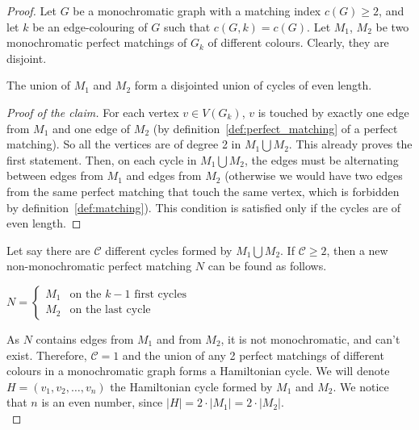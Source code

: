 \begin{proof}
    Let $G$ be a monochromatic graph with a matching index $c(G) \geq 2$, and let $k$ be an edge-colouring of $G$ such that $c(G, k) = c(G)$.
    Let $M_1$, $M_2$ be two monochromatic perfect matchings of $G_k$ of different colours.
    Clearly, they are disjoint.
    
    \begin{claim}
        \label{clm:even_cycles}
        The union of $M_1$ and $M_2$ form a disjointed union of cycles of even length.
    \end{claim}
    
    \begin{proof}[Proof of the claim]
        For each vertex $v \in V(G_k)$, $v$ is touched by exactly one edge from $M_1$ and one edge of $M_2$ (by definition~\ref{def:perfect_matching} of a perfect matching).
        So all the vertices are of degree 2 in $M_1 \bigcup M_2$.
        This already proves the first statement.
        Then, on each cycle in $M_1 \bigcup M_2$, the edges must be alternating between edges from $M_1$ and edges from $M_2$ (otherwise we would have two edges from the same perfect matching that touch the same vertex, which is forbidden by definition~\ref{def:matching}).
        This condition is satisfied only if the cycles are of even length.
    \end{proof}
    
    Let say there are $\mathcal{C}$ different cycles formed by $M_1 \bigcup M_2$.
    If $\mathcal{C} \geq 2$, then a new non-monochromatic perfect matching $N$ can be found as follows.
    
    \begin{center}
        $N = \left\{
        \begin{array}{ll}
            M_1 & \mbox{on the } k - 1 \mbox{ first cycles} \\
            M_2 & \mbox{on the last cycle}
        \end{array}
        \right.$
    \end{center}

    As $N$ contains edges from $M_1$ and from $M_2$, it is not monochromatic, and can't exist. Therefore, $\mathcal{C} = 1$ and the union of any 2 perfect matchings of different colours in a monochromatic graph forms a Hamiltonian cycle. We will denote $H = (v_1, v_2, \dots, v_n)$ the Hamiltonian cycle formed by $M_1$ and $M_2$. We notice that $n$ is an even number, since $|H| = 2 \cdot |M_1| = 2 \cdot |M_2|$.\\


\end{proof}
